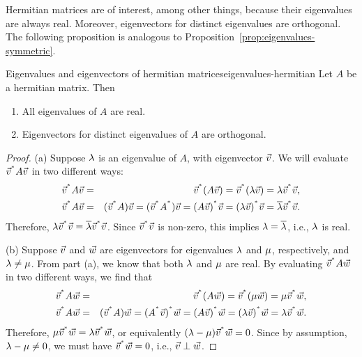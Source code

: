 \documentclass{ximera}
\begin{document}
Hermitian matrices are of interest, among other things, because their
eigenvalues are always real. Moreover, eigenvectors for distinct
eigenvalues are orthogonal. The following proposition is analogous to
Proposition~\ref{prop:eigenvalues-symmetric}.

\begin{proposition}{Eigenvalues and eigenvectors of hermitian matrices}{eigenvalues-hermitian}
  Let $A$ be a hermitian matrix. Then

    \begin{enumerate}
    \item All eigenvalues of $A$ are real.
    \item Eigenvectors for distinct eigenvalues of $A$ are orthogonal.
    \end{enumerate}

\end{proposition}

\begin{proof}
  (a) Suppose $\lambda$ is an eigenvalue of $A$, with eigenvector
  $\vec{v}$. We will evaluate $\vec{v}^{^{*}}A\vec{v}$ in two
  different ways:
  \begin{eqnarray*}
    \vec{v}^{^{*}}A\vec{v}
    &=& \vec{v}^{^{*}}(A\vec{v})
        = \vec{v}^{^{*}}(\lambda\vec{v})
        = \lambda\vec{v}^{^{*}}\vec{v}, \\
    \vec{v}^{^{*}}A\vec{v}
    &=& (\vec{v}^{^{*}}A)\vec{v}
        = (\vec{v}^{^{*}}A^{^{*}})\vec{v}
        = (A\vec{v})^{^{*}}\vec{v}
        = (\lambda\vec{v})^{^{*}}\vec{v}
        = \overline{\lambda}\vec{v}^{^{*}}\vec{v}.
  \end{eqnarray*}
  Therefore,
  $\lambda\vec{v}^{^{*}}\vec{v} =
  \overline{\lambda}\vec{v}^{^{*}}\vec{v}$. Since
  $\vec{v}^{^{*}}\vec{v}$ is non-zero, this implies
  $\lambda=\overline{\lambda}$, i.e., $\lambda$ is real.

  \noindent
  (b) Suppose $\vec{v}$ and $\vec{w}$ are eigenvectors for
  eigenvalues $\lambda$ and $\mu$, respectively, and
  $\lambda\neq\mu$. From part (a), we know that both
  $\lambda$ and $\mu$ are real.  By evaluating
  $\vec{v}^{^{*}}A\vec{w}$ in two different ways, we find that
  \begin{eqnarray*}
    \vec{v}^{^{*}}A\vec{w}
    &=& \vec{v}^{^{*}}(A\vec{w})
    = \vec{v}^{^{*}}(\mu\vec{w})
    = \mu \vec{v}^{^{*}}\vec{w}, \\
    \vec{v}^{^{*}}A\vec{w}
    &=& (\vec{v}^{^{*}}A)\vec{w}
    = (A^{^{*}}\vec{v})^{^{*}}\vec{w}
    = (A\vec{v})^{^{*}}\vec{w}
    = (\lambda\vec{v})^{^{*}}\vec{w}
    = \lambda\vec{v}^{^{*}}\vec{w}.
  \end{eqnarray*}
  Therefore,
  $\mu\vec{v}^{^{*}}\vec{w} = \lambda\vec{v}^{^{*}}\vec{w}$, or
  equivalently $(\lambda - \mu)\vec{v}^{^{*}}\vec{w} =
  0$. Since by assumption, $\lambda - \mu\neq 0$, we must
  have $\vec{v}^{^{*}}\vec{w} = 0$, i.e., $\vec{v}\perp\vec{w}$.
\end{proof}
\end{document}
